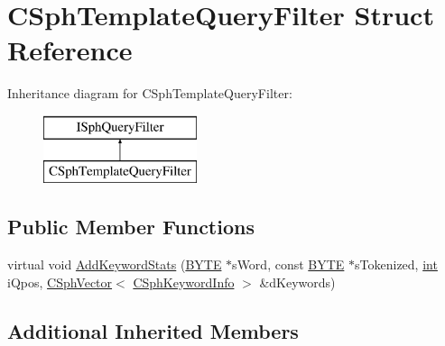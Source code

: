 \hypertarget{structCSphTemplateQueryFilter}{\section{C\-Sph\-Template\-Query\-Filter Struct Reference}
\label{structCSphTemplateQueryFilter}
}
Inheritance diagram for C\-Sph\-Template\-Query\-Filter\-:\begin{figure}[H]
\begin{center}
\leavevmode
\includegraphics[height=2.000000cm]{structCSphTemplateQueryFilter}
\end{center}
\end{figure}
\subsection*{Public Member Functions}
\begin{DoxyCompactItemize}
\item 
virtual void \hyperlink{structCSphTemplateQueryFilter_af0b166d8e76456a98f051d8a1aa16c12}{Add\-Keyword\-Stats} (\hyperlink{sphinxstd_8h_a4ae1dab0fb4b072a66584546209e7d58}{B\-Y\-T\-E} $\ast$s\-Word, const \hyperlink{sphinxstd_8h_a4ae1dab0fb4b072a66584546209e7d58}{B\-Y\-T\-E} $\ast$s\-Tokenized, \hyperlink{sphinxexpr_8cpp_a4a26e8f9cb8b736e0c4cbf4d16de985e}{int} i\-Qpos, \hyperlink{classCSphVector}{C\-Sph\-Vector}$<$ \hyperlink{structCSphKeywordInfo}{C\-Sph\-Keyword\-Info} $>$ \&d\-Keywords)
\end{DoxyCompactItemize}
\subsection*{Additional Inherited Members}


